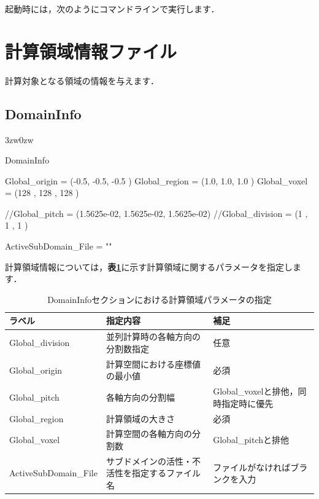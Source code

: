 起動時には，次のようにコマンドラインで実行します．
{
\small 
{}
}




\pagebreak
\section{計算領域情報ファイル}
計算対象となる領域の情報を与えます．

%
\subsection{DomainInfo}

\begin{indentation}{3zw}{0zw}

{\small
\begin{program}
DomainInfo {
  Global_origin   = (-0.5, -0.5, -0.5   )
  Global_region   = (1.0,  1.0,  1.0    )
  Global_voxel    = (128   , 128   , 128   )
  
  //Global_pitch    = (1.5625e-02, 1.5625e-02, 1.5625e-02)
  //Global_division = (1    , 1    , 1    )

  ActiveSubDomain_File = ""
}
\end{program}
}

計算領域情報については，\textbf{表\ref{tbl:region_info}}に示す計算領域に関するパラメータを指定します．

\begin{table}[htdp]
\caption{DomainInfoセクションにおける計算領域パラメータの指定}
\begin{center}
\small
\begin{tabular}{lll} \toprule
ラベル & 指定内容 & 補足\\ \midrule
Global\_division & 並列計算時の各軸方向の分割数指定 & 任意\\ 
Global\_origin & 計算空間における座標値の最小値 & 必須\\
Global\_pitch & 各軸方向の分割幅 &Global\_voxelと排他，同時指定時に優先\\
Global\_region & 計算領域の大きさ & 必須\\ 
Global\_voxel & 計算空間の各軸方向の分割数 & Global\_pitchと排他\\
ActiveSubDomain\_File & サブドメインの活性・不活性を指定するファイル名 & ファイルがなければブランクを入力\\ \bottomrule
\end{tabular}
\end{center}
\label{tbl:region_info}
\end{table}

\end{indentation}



